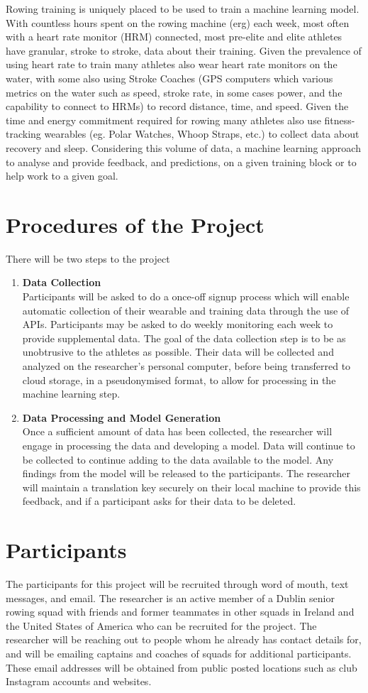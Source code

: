 Rowing training is uniquely placed to be used to train a machine learning model. With countless hours spent on the rowing machine (erg) each week, most often with a heart rate monitor (HRM) connected, most pre-elite and elite athletes have granular, stroke to stroke, data about their training. Given the prevalence of using heart rate to train many athletes also wear heart rate monitors on the water, with some also using Stroke Coaches (GPS computers which various metrics on the water such as speed, stroke rate, in some cases power, and the capability to connect to HRMs) to record distance, time, and speed. Given the time and energy commitment required for rowing many athletes also use fitness-tracking wearables (eg. Polar Watches, Whoop Straps, etc.) to collect data about recovery and sleep. Considering this volume of data, a machine learning approach to analyse and provide feedback, and predictions, on a given training block or to help work to a given goal.
\section*{Procedures of the Project}
There will be two steps to the project
\begin{enumerate}
    \item \textbf{Data Collection}\\Participants will be asked to do a once-off signup process which will enable automatic collection of their wearable and training data through the use of APIs. Participants may be asked to do weekly monitoring each week to provide supplemental data. The goal of the data collection step is to be as unobtrusive to the athletes as possible. Their data will be collected and analyzed on the researcher's personal computer, before being transferred to cloud storage, in a pseudonymised format, to allow for processing in the machine learning step.
    \item \textbf{Data Processing and Model Generation}\\Once a sufficient amount of data has been collected, the researcher will engage in processing the data and developing a model. Data will continue to be collected to continue adding to the data available to the model. Any findings from the model will be released to the participants. The researcher will maintain a translation key securely on their local machine to provide this feedback, and if a participant asks for their data to be deleted.
\end{enumerate}
\section*{Participants}
The participants for this project will be recruited through word of mouth, text messages, and email. The researcher is an active member of a Dublin senior rowing squad with friends and former teammates in other squads in Ireland and the United States of America who can be recruited for the project. The researcher will be reaching out to people whom he already has contact details for, and will be emailing captains and coaches of squads for additional participants. These email addresses will be obtained from public posted locations such as club Instagram accounts and websites.

